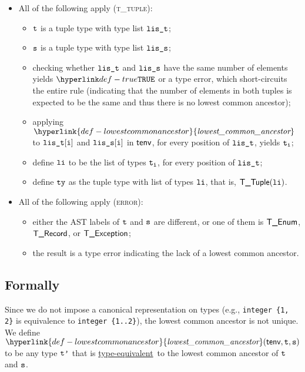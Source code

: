\documentclass{book}
\newcommand\ProseOrTypeError[0]{\ProseTerminateAs{\TypeErrorConfig}}
\newcommand\lca[0]{\hyperlink{def-lowestcommonancestor}{\textfunc{lowest\_common\_ancestor}}}
\newcommand\typeequivalent[0]{\hyperlink{def-typeequal}{type-equivalent}}
\begin{document}
\begin{itemize}
\begin{itemize}
    \item All of the following apply (\textsc{t\_tuple}):
    \begin{itemize}
      \item $\texttt{t}$ is a tuple type with type list $\texttt{lis\_t}$;
      \item $\texttt{s}$ is a tuple type with type list $\texttt{lis\_s}$;
      \item checking whether $\texttt{lis\_t}$ and $\texttt{lis\_s}$ have the same number of elements yields $\True$
            or a type error, which short-circuits the entire rule (indicating that the number of elements in both tuples is expected
            to be the same and thus there is no lowest common ancestor);
      \item applying $\lca$ to $\texttt{lis\_t}[\texttt{i}]$ and $\texttt{lis\_s}[\texttt{i}]$ in $\textsf{tenv}$, for every position of $\texttt{lis\_t}$,
            yields $\texttt{t}_{\texttt{i}}$\ProseOrTypeError;
      \item define $\texttt{li}$ to be the list of types $\texttt{t}_{\texttt{i}}$, for every position of $\texttt{lis\_t}$;
      \item define $\texttt{ty}$ as the tuple type with list of types $\texttt{li}$, that is, $\textsf{T\_Tuple}(\texttt{li})$.
    \end{itemize}

    \item All of the following apply (\textsc{error}):
    \begin{itemize}
      \item either the AST labels of $\texttt{t}$ and $\texttt{s}$ are different, or one of them is $\textsf{T\_Enum}$, $\textsf{T\_Record}$, or $\textsf{T\_Exception}$;
      \item the result is a type error indicating the lack of a lowest common ancestor.
    \end{itemize}
  \end{itemize}
\end{itemize}



\subsection{Formally}
Since we do not impose a canonical representation on types (e.g., \verb|integer {1, 2}| is equivalence to \verb|integer {1..2}|),
the lowest common ancestor is not unique.
We define $\lca(\tenv, \vt, \vs)$ to be any type $\texttt{t'}$ that is \typeequivalent\ to the lowest common ancestor of $\texttt{t}$ and $\texttt{s}$.
\end{document}
